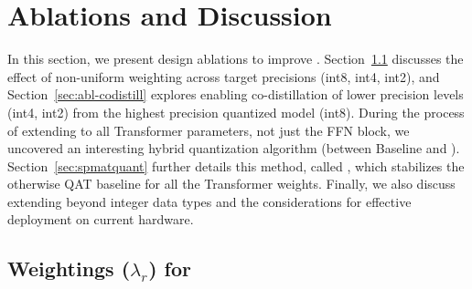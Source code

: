 \vspace*{-2mm}
\section{Ablations and Discussion}
\label{sec:disc}
In this section, we present design ablations to improve \alg. Section~\ref{sec:abl-weight} discusses the effect of non-uniform weighting across target precisions (int8, int4, int2), and Section~\ref{sec:abl-codistill} explores enabling co-distillation of lower precision levels (int4, int2) from the highest precision quantized model (int8). During the process of extending \alg to all Transformer parameters, not just the FFN block, we uncovered an interesting hybrid quantization algorithm (between Baseline and \alg). Section~\ref{sec:spmatquant} further details this method, called \spalg, which stabilizes the otherwise QAT baseline for all the Transformer weights. Finally, we also discuss extending \alg beyond integer data types and the considerations for effective deployment on current hardware.




\vspace*{-3mm}
\subsection{Weightings ($\lambda_r$) for \alg}
\label{sec:abl-weight}

